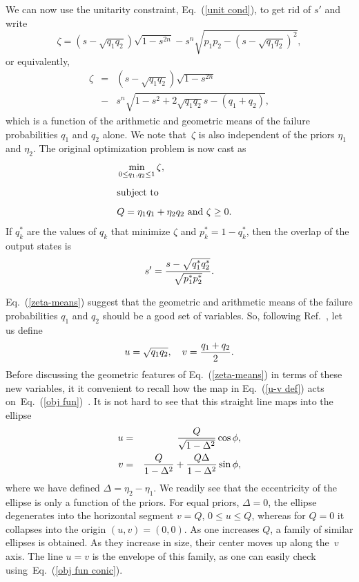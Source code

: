 \documentclass[aps,pra,twocolumn,showpacs]{revtex4-1}
\begin{document}
%
We can now use the unitarity constraint, Eq.~(\ref{unit cond}), to get rid of $s'$ and write
%
\begin{equation}
\zeta\!=\!(s-\sqrt{q_1q_2})\sqrt{1\!-\!s^{2n}}\!-\!s^n\!\sqrt{p_1p_2\!-\!(s\!-\!\sqrt{q_1q_2})^2},
\end{equation}
%
or equivalently,
%
\begin{eqnarray}
\zeta&=&(s-\sqrt{q_1q_2})\sqrt{1-s^{2n}}\nonumber\\
&-&s^n\sqrt{1-s^2+2\sqrt{q_1q_2}s-(q_1+q_2)},
\label{zeta-means}
\end{eqnarray}
%
which is a function of the arithmetic and geometric means of the failure probabilities $q_1$ and $q_2$ alone. We note that~$\zeta$ is also independent of the priors $\eta_1$ and $\eta_2$.
The original optimization problem is now cast as
%
\begin{eqnarray}
&\displaystyle \min_{0\le q_1,q_2\le1} \zeta,&\nonumber\\[.5em]
&\mbox{\rm subject to}&\nonumber\\[.5em]
&\mbox{$\displaystyle Q=\eta_1 q_1+\eta_2 q_2$ and $\zeta\ge0$}.&
\end{eqnarray}
%
If $q^*_k$ are the values of $q_k$ that minimize $\zeta$ and $p^*_k=1-q^*_k$, then the overlap of the output states is
%
\begin{equation}
s'={s-\sqrt{q^*_1q^*_2}\over\sqrt{p^*_1p^*_2}}.
\end{equation}
%

\bigskip

 Eq.~(\ref{zeta-means}) suggest that the geometric and arithmetic means of the failure probabilities $q_1$ and $q_2$ should be a good set of variables. So, following Ref.~\cite{us2}, let us define
%
\begin{equation}
u=\sqrt{q_1q_2},\quad v={q_1+q_2\over2}.
\label{u-v def}
\end{equation}
%
Before discussing the geometric features of Eq.~(\ref{zeta-means}) in terms of these new variables, it it convenient to recall how the map in Eq.~(\ref{u-v def}) acts on~Eq.~(\ref{obj fun})~\cite{us2}. It is not hard to see that
this straight line maps into the ellipse
%
\begin{eqnarray}
u&=&{Q\over\sqrt{1-\Delta^2}}\cos\phi,\nonumber\\
v&=&{Q\over1-\Delta^2}+{Q\Delta\over1-\Delta^2}\sin\phi,
\label{obj fun conic}
\end{eqnarray}
%
where we have defined $\Delta=\eta_2-\eta_1$.  We readily see that the eccentricity of the ellipse is only a function of the priors. For equal priors, $\Delta=0$, the ellipse degenerates into the horizontal segment $v=Q$, $0\le u\le Q$, whereas for $Q=0$ it collapses into the origin $(u,v)=(0,0)$. As one increases $Q$, a family of similar ellipses is obtained. As they increase in size, their center moves up along the~$v$ axis. The line $u=v$ is the envelope of this family, as one can easily check using~Eq.~(\ref{obj fun conic}).
\end{document}
